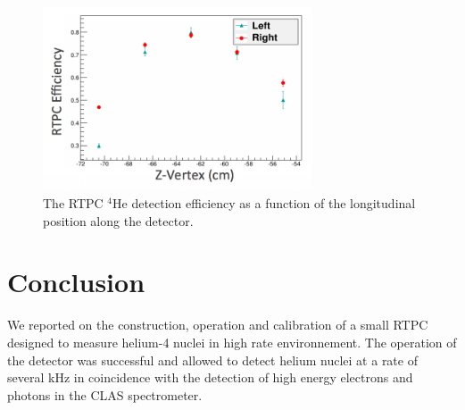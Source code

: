 \documentclass[twocolumn,showpacs,superscriptaddress,groupedaddress]{revtex4}
\begin{document}
\begin{figure}[tb]
\centering
\includegraphics[width=8cm]{fig/tpceff.png}
\caption{The RTPC $^4$He detection efficiency as a function of the longitudinal 
   position along the detector.
 \label{fig:rtpc_eff}}
 \end{figure}


\section{Conclusion}

We reported on the construction, operation and calibration of a small RTPC 
designed to measure helium-4 nuclei in high rate environnement. The operation
of the detector was successful and allowed to detect helium nuclei at a rate
of several kHz in coincidence with the detection of high energy electrons and 
photons in the CLAS spectrometer. 

  
\end{document}
